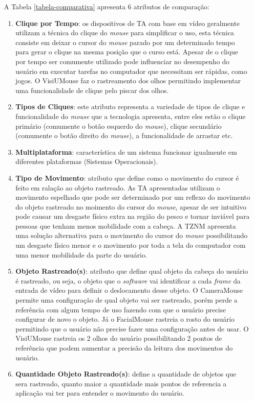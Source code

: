 A Tabela \ref{tabela-comparativa} apresenta 6 atributos de comparação:
\begin{enumerate}
\item \textbf{Clique por Tempo}: os dispositivos de TA com base em vídeo geralmente utilizam a técnica do clique do \textit{mouse} para simplificar o uso, esta técnica consiste em deixar o cursor do \textit{mouse} parado por um determinado tempo para gerar o clique na mesma posição que o curso está. Apesar de o clique por tempo ser comumente utilizado pode influenciar no desempenho do usuário em executar tarefas no computador que necessitam ser rápidas, como jogos. O VisiUMouse faz o rastreamento dos olhos permitindo implementar uma funcionalidade de clique pelo piscar dos olhos. 
\item \textbf{Tipos de Cliques}: este atributo representa a variedade de tipos de clique e funcionalidade do \textit{mouse} que a tecnologia apresenta, entre eles estão o clique primário (comumente o botão esquerdo do \textit{mouse}), clique secundário (comumente o botão direito do \textit{mouse}), a funcionalidade de arrastar etc.
\item \textbf{Multiplataforma}: característica de um sistema funcionar igualmente em diferentes plataformas (Sistemas Operacionais).
\item \textbf{Tipo de Movimento}: atributo que define como o movimento do cursor é feito em ralação ao objeto rastreado. As TA apresentadas utilizam o movimento espelhado que pode ser determinado por um reflexo do movimento do objeto rastreado no moimento do cursor do \textit{mouse}, apesar de ser intuitivo pode causar um desgaste físico extra na região do pesco e tornar inviável para pessoas que tenham menos mobilidade com a cabeça. A TZNM apresenta uma solução alternativa para o movimento do cursor do \textit{mouse} possibilitando um desgaste físico menor e o movimento por toda a tela do computador com uma menor mobilidade da parte do usuário.
\item \textbf{Objeto Rastreado(s)}: atributo que define qual objeto da cabeça do usuário é rastreado, ou seja, o objeto que o \textit{software} vai identificar a cada \textit{frame} da entrada de vídeo para definir o deslocamento desse objeto. O CameraMouse permite uma configuração de qual objeto vai ser rastreado, porém perde a referência com algum tempo de uso fazendo com que o usuário precise configurar de novo o objeto. Já o FacialMouse rastreia o rosto do usuário permitindo que o usuário não precise fazer uma configuração antes de usar. O VisiUMouse rastreia os 2 olhos do usuário possibilitando 2 pontos de referência que podem aumentar a precisão da leitura dos movimentos do usuário.
\item \textbf{Quantidade Objeto Rastreado(s)}: define a quantidade de objetos que sera rastreado, quanto maior a quantidade mais pontos de referencia a aplicação vai ter para entender o movimento do usuário.
\end{enumerate}


